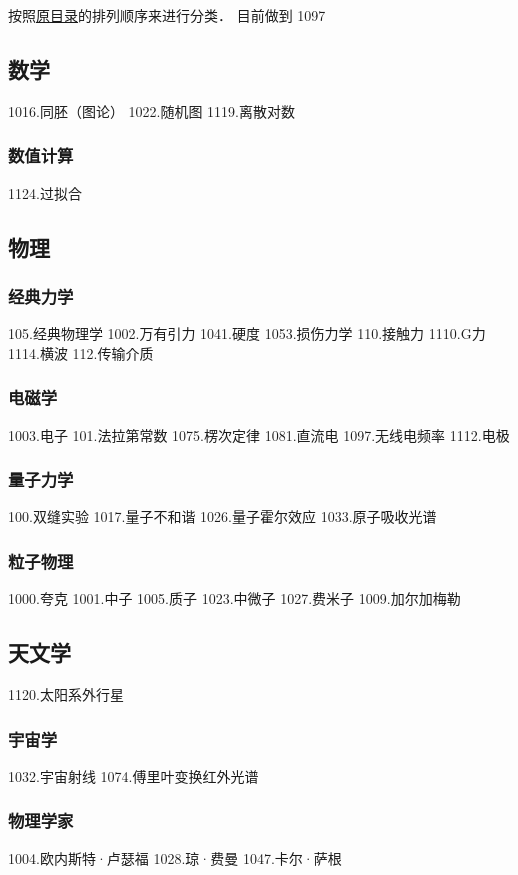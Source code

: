 
\begin{issues}
\issueDraft
\end{issues}

按照\href{https://wuli.wiki/assets/sogou}{原目录}的排列顺序来进行分类． 目前做到 1097

\subsection{数学}

1016.同胚（图论）
1022.随机图
1119.离散对数
\subsubsection{数值计算}
1124.过拟合

\subsection{物理}
\subsubsection{经典力学}
105.经典物理学
1002.万有引力
1041.硬度
1053.损伤力学
110.接触力
1110.G力
1114.横波
112.传输介质
\subsubsection{电磁学}
1003.电子
101.法拉第常数
1075.楞次定律
1081.直流电
1097.无线电频率
1112.电极
\subsubsection{量子力学}
100.双缝实验
1017.量子不和谐
1026.量子霍尔效应
1033.原子吸收光谱
\subsubsection{粒子物理}
1000.夸克
1001.中子
1005.质子
1023.中微子
1027.费米子
1009.加尔加梅勒
\subsection{天文学}
1120.太阳系外行星
\subsubsection{宇宙学}
1032.宇宙射线
1074.傅里叶变换红外光谱
\subsubsection{物理学家}
1004.欧内斯特·卢瑟福
1028.琼·费曼
1047.卡尔·萨根


